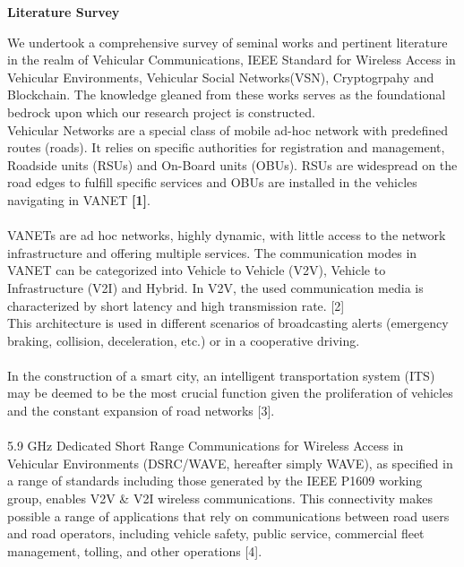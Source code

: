 \documentclass[a4paper,14pt]{extarticle}
\begin{document}
\begin{center}
    {\LARGE \textbf{Literature Survey}} \\
    \vspace{1cm}
\end{center}
We undertook a comprehensive survey of seminal works and pertinent literature in the realm of Vehicular Communications, IEEE Standard for Wireless Access in Vehicular Environments, Vehicular Social Networks(VSN), Cryptogrpahy and Blockchain. The knowledge gleaned from these works serves as the foundational bedrock upon which our
research project is constructed.
\\
Vehicular Networks are a special class of mobile ad-hoc network with predefined routes (roads). It relies on specific authorities for registration and management, Roadside units (RSUs) and On-Board units (OBUs). RSUs are widespread on the road edges to fulfill specific services and OBUs are installed in the vehicles navigating in VANET \textbf{[1]}. \\ \\
VANETs are ad hoc networks, highly dynamic, with little access to the network infrastructure and offering multiple services. The communication modes in VANET can be categorized into Vehicle to Vehicle (V2V), Vehicle to
Infrastructure (V2I) and Hybrid. In V2V, the used communication media is characterized by short latency and high transmission rate. [2]
\\
This architecture is used in different scenarios of broadcasting alerts (emergency braking, collision,
deceleration, etc.) or in a cooperative driving. 
\\ \\
In the construction of a smart city, an intelligent transportation system (ITS) may be deemed to be the most crucial function given the proliferation of vehicles and the constant expansion of road networks [3].
\\ \\ 
5.9 GHz Dedicated Short Range Communications for Wireless Access in Vehicular Environments (DSRC/WAVE, hereafter simply WAVE), as specified in a range of standards including those generated by the IEEE P1609 working group, enables V2V \& V2I wireless communications. This connectivity makes possible a range of applications that rely on communications between road users and road operators, including vehicle safety, public service, commercial fleet management, tolling, and other operations [4].
\\ \\
\end{document}
